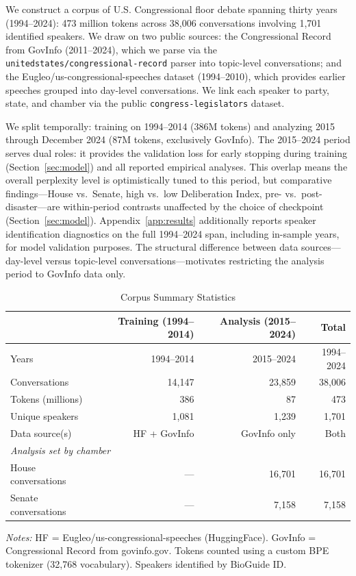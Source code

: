 \documentclass[12pt]{article}
\begin{document}
We construct a corpus of U.S. Congressional floor debate spanning thirty years (1994--2024): 473 million tokens across 38,006 conversations involving 1,701 identified speakers. We draw on two public sources: the Congressional Record from GovInfo \citep{govinfo} (2011--2024), which we parse via the \texttt{unitedstates/\allowbreak{}congressional-record} parser \citep{unitedstates_parser} into topic-level conversations; and the Eugleo/\allowbreak{}us-congressional-speeches dataset \citep{eugleo2023} (1994--2010), which provides earlier speeches grouped into day-level conversations. We link each speaker to party, state, and chamber via the public \texttt{congress-legislators} dataset.

We split temporally: training on 1994--2014 (386M tokens) and analyzing 2015 through December 2024 (87M tokens, exclusively GovInfo). The 2015--2024 period serves dual roles: it provides the validation loss for early stopping during training (Section~\ref{sec:model}) and all reported empirical analyses. This overlap means the overall perplexity level is optimistically tuned to this period, but comparative findings---House vs.\ Senate, high vs.\ low Deliberation Index, pre- vs.\ post-disaster---are within-period contrasts unaffected by the choice of checkpoint (Section~\ref{sec:model}). Appendix~\ref{app:results} additionally reports speaker identification diagnostics on the full 1994--2024 span, including in-sample years, for model validation purposes. The structural difference between data sources---day-level versus topic-level conversations---motivates restricting the analysis period to GovInfo data only.

\begin{table}[H]
\centering
\caption{Corpus Summary Statistics}
\label{tab:corpus}
\begin{threeparttable}
\begin{tabular}{lrrr}
\toprule
& Training (1994--2014) & Analysis (2015--2024) & Total \\
\midrule
Years & 1994--2014 & 2015--2024 & 1994--2024 \\
Conversations & 14,147 & 23,859 & 38,006 \\
Tokens (millions) & 386 & 87 & 473 \\
Unique speakers & 1,081 & 1,239 & 1,701 \\
Data source(s) & HF + GovInfo & GovInfo only & Both \\
\midrule
\multicolumn{4}{l}{\textit{Analysis set by chamber}} \\
\quad House conversations & --- & 16,701 & 16,701 \\
\quad Senate conversations & --- & 7,158 & 7,158 \\
\bottomrule
\end{tabular}
\begin{tablenotes}[flushleft]
\small
\item \textit{Notes:} HF = Eugleo/us-congressional-speeches (HuggingFace). GovInfo = Congressional Record from govinfo.gov. Tokens counted using a custom BPE tokenizer (32,768 vocabulary). Speakers identified by BioGuide ID.
\end{tablenotes}
\end{threeparttable}
\end{table}
\end{document}
